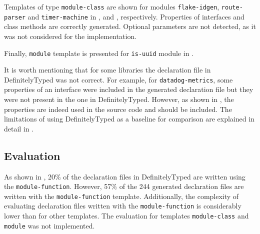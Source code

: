 Templates of type \texttt{module-class} are shown for modules \texttt{flake-idgen}, \texttt{route-parser} and \texttt{timer-machine} in ,  and , respectively. Properties of interfaces and class methods are correctly generated. Optional parameters are not detected, as it was not considered for the implementation.

Finally, \texttt{module} template is presented for \texttt{is-uuid} module in .

It is worth mentioning that for some libraries the declaration file in DefinitelyTyped was not correct. For example, for \texttt{datadog-metrics}, some properties of an interface were included in the generated declaration file but they were not present in the one in DefinitelyTyped. However, as shown in , the properties are indeed used in the source code and should be included. The limitations of using DefinitelyTyped as a baseline for comparison are explained in detail in .













\subsection{Evaluation}
As shown in , 20\% of the declaration files in DefinitelyTyped are written using the \texttt{module-function}. However, 57\% of the 244 generated declaration files are written with the \texttt{module-function} template. Additionally, the complexity of evaluating declaration files written with the \texttt{module-function} is considerably lower than for other templates. The evaluation for templates \texttt{module-class} and \texttt{module} was not implemented.

